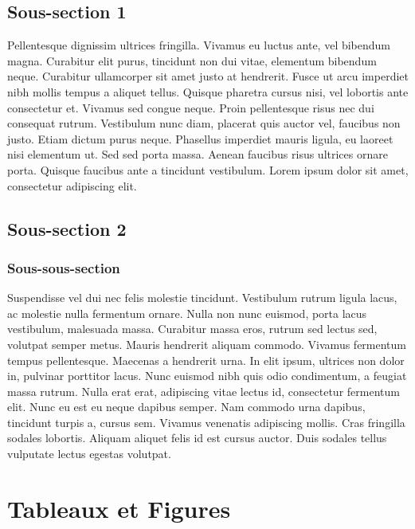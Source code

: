 \documentclass[jimisdraft]{jimis-fr}
\begin{document}
\subsection{Sous-section 1}
Pellentesque dignissim ultrices fringilla. Vivamus eu luctus ante, vel bibendum magna. Curabitur elit purus, tincidunt non dui vitae, elementum bibendum neque. Curabitur ullamcorper sit amet justo at hendrerit. Fusce ut arcu imperdiet nibh mollis tempus a aliquet tellus. Quisque pharetra cursus nisi, vel lobortis ante consectetur et. Vivamus sed congue neque. Proin pellentesque risus nec dui consequat rutrum. Vestibulum nunc diam, placerat quis auctor vel, faucibus non justo. Etiam dictum purus neque. Phasellus imperdiet mauris ligula, eu laoreet nisi elementum ut. Sed sed porta massa. Aenean faucibus risus ultrices ornare porta. Quisque faucibus ante a tincidunt vestibulum. Lorem ipsum dolor sit amet, consectetur adipiscing elit.


\subsection{Sous-section 2}
\subsubsection{Sous-sous-section}
Suspendisse vel dui nec felis molestie tincidunt. Vestibulum rutrum ligula lacus, ac molestie nulla fermentum ornare. Nulla non nunc euismod, porta lacus vestibulum, malesuada massa. Curabitur massa eros, rutrum sed lectus sed, volutpat semper metus. Mauris hendrerit aliquam commodo.  Vivamus fermentum tempus pellentesque. Maecenas a hendrerit urna. In elit ipsum, ultrices non dolor in, pulvinar porttitor lacus. Nunc euismod nibh quis odio condimentum, a feugiat massa rutrum. Nulla erat erat, adipiscing vitae lectus id, consectetur fermentum elit. Nunc eu est eu neque dapibus semper. Nam commodo urna dapibus, tincidunt turpis a, cursus sem. Vivamus venenatis adipiscing mollis. Cras fringilla sodales lobortis. Aliquam aliquet felis id est cursus auctor. Duis sodales tellus vulputate lectus egestas volutpat.





\section{Tableaux et Figures}
\end{document}
